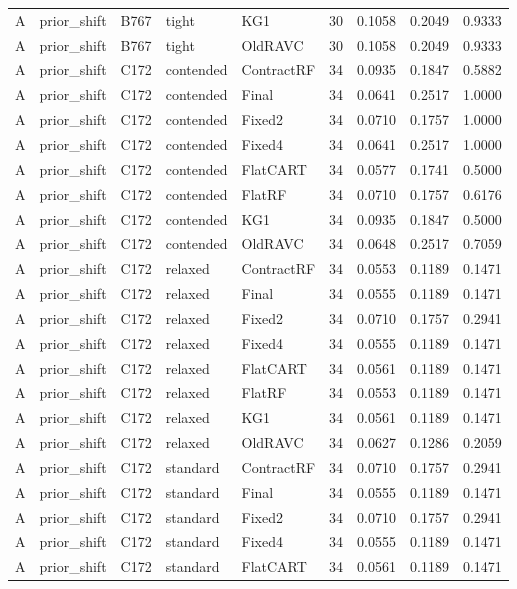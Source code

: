 \begin{longtable}{@{}lllllllll@{}}
A & prior\_shift & B767 & tight & KG1 & 30 & 0.1058 & 0.2049 & 0.9333\\
A & prior\_shift & B767 & tight & OldRAVC & 30 & 0.1058 & 0.2049 & 0.9333\\
A & prior\_shift & C172 & contended & ContractRF & 34 & 0.0935 & 0.1847 & 0.5882\\
A & prior\_shift & C172 & contended & Final & 34 & 0.0641 & 0.2517 & 1.0000\\
A & prior\_shift & C172 & contended & Fixed2 & 34 & 0.0710 & 0.1757 & 1.0000\\
A & prior\_shift & C172 & contended & Fixed4 & 34 & 0.0641 & 0.2517 & 1.0000\\
A & prior\_shift & C172 & contended & FlatCART & 34 & 0.0577 & 0.1741 & 0.5000\\
A & prior\_shift & C172 & contended & FlatRF & 34 & 0.0710 & 0.1757 & 0.6176\\
A & prior\_shift & C172 & contended & KG1 & 34 & 0.0935 & 0.1847 & 0.5000\\
A & prior\_shift & C172 & contended & OldRAVC & 34 & 0.0648 & 0.2517 & 0.7059\\
A & prior\_shift & C172 & relaxed & ContractRF & 34 & 0.0553 & 0.1189 & 0.1471\\
A & prior\_shift & C172 & relaxed & Final & 34 & 0.0555 & 0.1189 & 0.1471\\
A & prior\_shift & C172 & relaxed & Fixed2 & 34 & 0.0710 & 0.1757 & 0.2941\\
A & prior\_shift & C172 & relaxed & Fixed4 & 34 & 0.0555 & 0.1189 & 0.1471\\
A & prior\_shift & C172 & relaxed & FlatCART & 34 & 0.0561 & 0.1189 & 0.1471\\
A & prior\_shift & C172 & relaxed & FlatRF & 34 & 0.0553 & 0.1189 & 0.1471\\
A & prior\_shift & C172 & relaxed & KG1 & 34 & 0.0561 & 0.1189 & 0.1471\\
A & prior\_shift & C172 & relaxed & OldRAVC & 34 & 0.0627 & 0.1286 & 0.2059\\
A & prior\_shift & C172 & standard & ContractRF & 34 & 0.0710 & 0.1757 & 0.2941\\
A & prior\_shift & C172 & standard & Final & 34 & 0.0555 & 0.1189 & 0.1471\\
A & prior\_shift & C172 & standard & Fixed2 & 34 & 0.0710 & 0.1757 & 0.2941\\
A & prior\_shift & C172 & standard & Fixed4 & 34 & 0.0555 & 0.1189 & 0.1471\\
A & prior\_shift & C172 & standard & FlatCART & 34 & 0.0561 & 0.1189 & 0.1471\\

\end{longtable}
